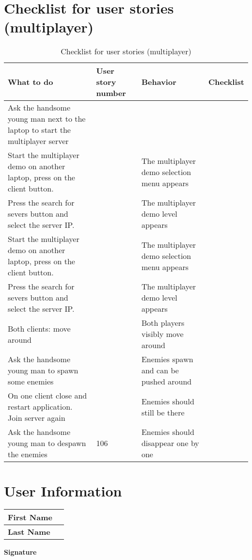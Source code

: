 \documentclass{article}
\begin{document}
\section{Checklist for user stories (multiplayer)}
\begin{table}[H]
    \centering
    \begin{tabular}{|p{3cm}|p{3cm}|p{6cm}|p{3cm}|}
    \hline
    \textbf{What to do} & \textbf{User story number} & \textbf{Behavior} & \textbf{Checklist} \\ \hline
    Ask the handsome young man next to the laptop to start the multiplayer server & & & \\ \hline
    Start the multiplayer demo on another laptop, press on the client button. & & The multiplayer demo selection menu appears & \\ \hline
    Press the search for severs button and select the server IP. & & The multiplayer demo level appears & \\ \hline
    Start the multiplayer demo on another laptop, press on the client button. & & The multiplayer demo selection menu appears & \\ \hline
    Press the search for severs button and select the server IP. & & The multiplayer demo level appears & \\ \hline
    Both clients: move around & & Both players visibly move around & \\ \hline
    Ask the handsome young man to spawn some enemies & & Enemies spawn and can be pushed around & \\ \hline
    On one client close and restart application. Join server again & & Enemies should still be there & \\ \hline
    Ask the handsome young man to despawn the enemies & 106 & Enemies should disappear one by one & \\ \hline

    \end{tabular}
    \caption{Checklist for user stories (multiplayer)}
    \label{tab:user_stories}
    \end{table}

    \section{User Information}
    \begin{longtable}{|p{5cm}|p{10cm}|}
    \hline
    \textbf{First Name} & \\ \hline
    \textbf{Last Name} & \\ \hline
    \end{longtable}

    \textbf{Signature} \dotfill
\end{document}
